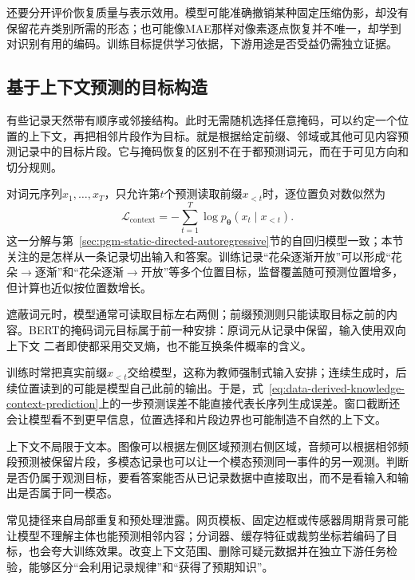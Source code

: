 还要分开评价恢复质量与表示效用。模型可能准确撤销某种固定压缩伪影，却没有保留花卉类别所需的形态；也可能像MAE那样对像素逐点恢复并不唯一，却学到对识别有用的编码。训练目标提供学习依据，下游用途是否受益仍需独立证据。

\subsection{基于上下文预测的目标构造}
\label{sec:data-derived-knowledge-context-prediction}

有些记录天然带有顺序或邻接结构。此时无需随机选择任意掩码，可以约定一个位置的上下文，再把相邻片段作为目标。就是根据给定前缀、邻域或其他可见内容预测记录中的目标片段。它与掩码恢复的区别不在于都预测词元，而在于可见方向和切分规则。

对词元序列$x_1,\ldots,x_T$，只允许第$t$个预测读取前缀$x_{<t}$时，逐位置负对数似然为
\begin{equation}
  \mathcal{L}_{\mathrm{context}}
  =-\sum_{t=1}^{T}\log p_{\bm{\theta}}(x_t\mid x_{<t}).
  \label{eq:data-derived-knowledge-context-prediction}
\end{equation}
这一分解与第~\ref{sec:pgm-static-directed-autoregressive}节的自回归模型一致；本节关注的是怎样从一条记录切出输入和答案。训练记录“花朵逐渐开放”可以形成“花朵$\to$逐渐”和“花朵逐渐$\to$开放”等多个位置目标，监督覆盖随可预测位置增多，但计算也近似按位置数增长。

遮蔽词元时，模型通常可读取目标左右两侧；前缀预测则只能读取目标之前的内容。BERT的掩码词元目标属于前一种安排：原词元从记录中保留，输入使用双向上下文
二者即使都采用交叉熵，也不能互换条件概率的含义。

训练时常把真实前缀$x_{<t}$交给模型，这称为教师强制式输入安排；连续生成时，后续位置读到的可能是模型自己此前的输出。于是，式~\eqref{eq:data-derived-knowledge-context-prediction}上的一步预测误差不能直接代表长序列生成误差。窗口截断还会让模型看不到更早信息，位置选择和片段边界也可能制造不自然的上下文。

上下文不局限于文本。图像可以根据左侧区域预测右侧区域，音频可以根据相邻频段预测被保留片段，多模态记录也可以让一个模态预测同一事件的另一观测。判断是否仍属于观测目标，要看答案能否从已记录数据中直接取出，而不是看输入和输出是否属于同一模态。

常见捷径来自局部重复和预处理泄露。网页模板、固定边框或传感器周期背景可能让模型不理解主体也能预测相邻内容；分词器、缓存特征或裁剪坐标若编码了目标，也会夸大训练效果。改变上下文范围、删除可疑元数据并在独立下游任务检验，能够区分“会利用记录规律”和“获得了预期知识”。

